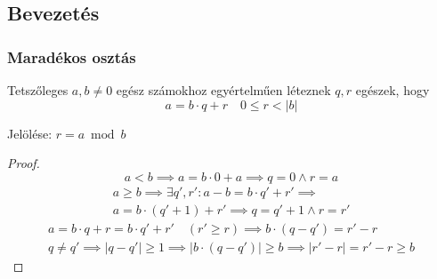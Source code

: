 \setcounter{definition}{0}
\setcounter{theorem}{0}
\subsection{Bevezetés}
\subsubsection{Maradékos osztás}
\begin{theorem}
    Tetszőleges $a, b \neq 0$ egész számokhoz
    egyértelműen léteznek $q, r$ egészek, hogy
    \begin{equation*}
        a = b \cdot q + r \quad 0 \leq r < |b|
    \end{equation*}
\end{theorem}
\begin{remark*}
    Jelölése: $r = a \bmod b$
\end{remark*}
\begin{proof}
    \begin{equation*}
        a < b \implies a = b \cdot 0 + a \implies q = 0 \land r = a
    \end{equation*}
    \begin{multline*}
        a \geq b \implies \exists q', r': a - b = b \cdot q' + r' \implies \\
        a = b \cdot (q' + 1) + r' \implies q = q' + 1 \land r = r'
    \end{multline*}
    \begin{gather*}
        a = b \cdot q + r = b \cdot q' + r' \quad (r' \geq r) \implies
        b \cdot (q - q') = r' - r \\
        q \neq q' \implies |q - q'| \geq 1 \implies
		|b \cdot (q - q')| \geq b \implies |r' - r| = r' - r \geq b
        \tag{Ellentmondás, mert $r, r' < |b|$}
    \end{gather*}
\end{proof}
